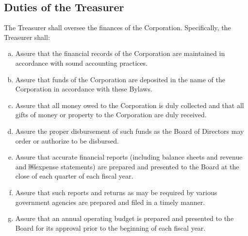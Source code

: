 \subsection{Duties of the Treasurer}
The Treasurer shall oversee the finances of the
Corporation. Specifically, the Treasurer shall:
\begin{enumerate}[a.]
\item Assure that the financial records of the Corporation are
  maintained in accordance with sound accounting practices.
\item Assure that funds of the Corporation are deposited in the name
  of the Corporation in accordance with these Bylaws.
\item Assure that all money owed to the Corporation is duly collected
  and that all gifts of money or property to the Corporation are duly
  received.
\item Assure the proper disbursement of such funds as the Board of
  Directors may order or authorize to be disbursed.
\item Assure that accurate financial reports (including balance sheets
  and revenue and ￼expense statements) are prepared and presented to
  the Board at the close of each quarter of each fiscal year.
\item Assure that such reports and returns as may be required by
  various government agencies are prepared and filed in a timely
  manner.
\item Assure that an annual operating budget is prepared and presented
  to the Board for its approval prior to the beginning of each fiscal
  year.
\end{enumerate}


